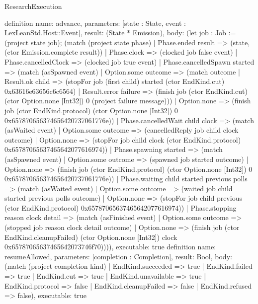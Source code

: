 \begin{lexlean}{ResearchExecution}
\begin{semanticmodule}
definition{
  name: advance,
  parameters: [state : State, event : LexLeanStd.Host::Event],
  result: (State * Emission),
  body: (let job : Job := (project state job); (match (project state phase)
    | Phase.ended result => (state, (ctor Emission.complete result))
    | Phase.clock => (clocked job false event)
    | Phase.cancelledClock => (clocked job true event)
    | Phase.cancelledSpawn started => (match (asSpawned event)
      | Option.some outcome => (match outcome
        | Result.ok child => (stopFor job (first child) started (ctor EndKind.cut) 0x63616e63656c6c6564)
        | Result.error failure => (finish job (ctor EndKind.cut) (ctor Option.none [Int32]) 0 (project failure message)))
      | Option.none => (finish job (ctor EndKind.protocol) (ctor Option.none [Int32]) 0 0x657870656374656420737061776e))
    | Phase.cancelledWait child clock => (match (asWaited event)
      | Option.some outcome => (cancelledReply job child clock outcome)
      | Option.none => (stopFor job child clock (ctor EndKind.protocol) 0x65787065637465642077616974))
    | Phase.spawning started => (match (asSpawned event)
      | Option.some outcome => (spawned job started outcome)
      | Option.none => (finish job (ctor EndKind.protocol) (ctor Option.none [Int32]) 0 0x657870656374656420737061776e))
    | Phase.waiting child started previous polls => (match (asWaited event)
      | Option.some outcome => (waited job child started previous polls outcome)
      | Option.none => (stopFor job child previous (ctor EndKind.protocol) 0x65787065637465642077616974))
    | Phase.stopping reason clock detail => (match (asFinished event)
      | Option.some outcome => (stopped job reason clock detail outcome)
      | Option.none => (finish job (ctor EndKind.cleanupFailed) (ctor Option.none [Int32]) clock 0x65787065637465642073746f70)))),
  executable: true
}
definition{
  name: resumeAllowed,
  parameters: [completion : Completion],
  result: Bool,
  body: (match (project completion kind)
    | EndKind.succeeded => true
    | EndKind.failed => true
    | EndKind.cut => true
    | EndKind.unavailable => true
    | EndKind.protocol => false
    | EndKind.cleanupFailed => false
    | EndKind.refused => false),
  executable: true
}



\end{semanticmodule}
\end{lexlean}
